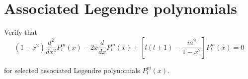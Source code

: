 

\section*{Associated Legendre polynomials}

Verify that
\begin{equation*}
(1-x^2)\frac{d^2}{dx^2}P_l^m(x)-2x\frac{d}{dx}P_l^m(x)+\left[l(l+1)-\frac{m^2}{1-x^2}\right]P_l^m(x)=0
\tag{1}
\end{equation*}

for selected associated Legendre polynomials $P_l^m(x)$.


